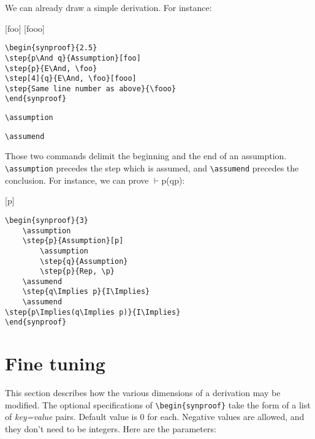 \documentclass{article}
\begin{document}
\vspace{10pt}
\noindent We can already draw a simple derivation. For instance:

\begin{synproof}{2.5}
[foo]
[fooo]
\end{synproof}

\begin{verbatim}
\begin{synproof}{2.5}
\step{p\And q}{Assumption}[foo]
\step{p}{E\And, \foo}
\step[4]{q}{E\And, \foo}[fooo]
\step{Same line number as above}{\fooo}
\end{synproof}
\end{verbatim}

\noindent\verb+\assumption+\nopagebreak

\noindent\verb+\assumend+

\noindent Those two commands delimit the beginning and the end of an assumption. \verb+\assumption+ precedes the step which is assumed, and \verb+\assumend+ precedes the conclusion. For instance, we can prove $\vdash$p\Implies(q\Implies p):
 
\begin{synproof}{3}
	\assumption
		\assumption
	\assumend
	\assumend
{}
\end{synproof}

\begin{verbatim}
\begin{synproof}{3}
	\assumption
	\step{p}{Assumption}[p]
		\assumption
		\step{q}{Assumption}
		\step{p}{Rep, \p}
	\assumend
	\step{q\Implies p}{I\Implies}
	\assumend
\step{p\Implies(q\Implies p)}{I\Implies}
\end{synproof}
\end{verbatim}

\section{Fine tuning}
This section describes how the various dimensions of a derivation may be modified. The optional specifications of \verb+\begin{synproof}+ take the form of a list of \emph{key=value} pairs. Default value is 0 for each. Negative values are allowed, and they don't need to be integers. Here are the parameters:
\end{document}
